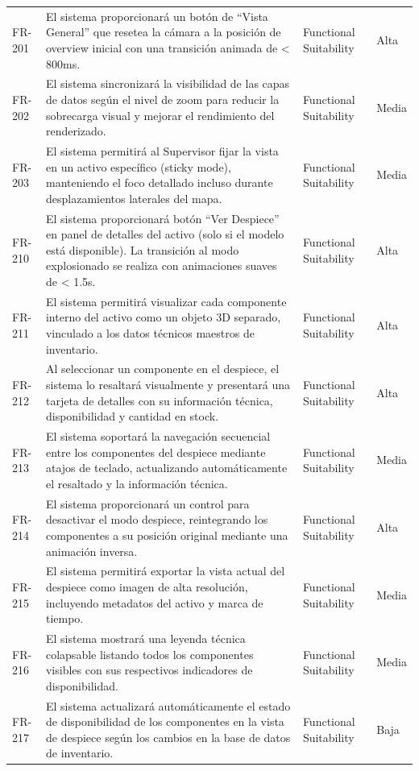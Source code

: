 \begin{longtable}{>{\raggedright\arraybackslash}p{} >{\raggedright\arraybackslash}p{} >{\raggedright\arraybackslash}p{} >{\raggedright\arraybackslash}p{}}
FR-201 & El sistema proporcionará un botón de ``Vista General'' que resetea la cámara a la posición de overview inicial con una transición animada de < 800ms. & Functional Suitability & Alta \\
FR-202 & El sistema sincronizará la visibilidad de las capas de datos según el nivel de zoom para reducir la sobrecarga visual y mejorar el rendimiento del renderizado. & Functional Suitability & Media \\
FR-203 & El sistema permitirá al Supervisor fijar la vista en un activo específico (sticky mode), manteniendo el foco detallado incluso durante desplazamientos laterales del mapa. & Functional Suitability & Media \\
FR-210 & El sistema proporcionará botón ``Ver Despiece'' en panel de detalles del activo (solo si el modelo está disponible). La transición al modo explosionado se realiza con animaciones suaves de < 1.5s. & Functional Suitability & Alta \\
FR-211 & El sistema permitirá visualizar cada componente interno del activo como un objeto 3D separado, vinculado a los datos técnicos maestros de inventario. & Functional Suitability & Alta \\
FR-212 & Al seleccionar un componente en el despiece, el sistema lo resaltará visualmente y presentará una tarjeta de detalles con su información técnica, disponibilidad y cantidad en stock. & Functional Suitability & Alta \\
FR-213 & El sistema soportará la navegación secuencial entre los componentes del despiece mediante atajos de teclado, actualizando automáticamente el resaltado y la información técnica. & Functional Suitability & Media \\
FR-214 & El sistema proporcionará un control para desactivar el modo despiece, reintegrando los componentes a su posición original mediante una animación inversa. & Functional Suitability & Alta \\
FR-215 & El sistema permitirá exportar la vista actual del despiece como imagen de alta resolución, incluyendo metadatos del activo y marca de tiempo. & Functional Suitability & Media \\
FR-216 & El sistema mostrará una leyenda técnica colapsable listando todos los componentes visibles con sus respectivos indicadores de disponibilidad. & Functional Suitability & Media \\
FR-217 & El sistema actualizará automáticamente el estado de disponibilidad de los componentes en la vista de despiece según los cambios en la base de datos de inventario. & Functional Suitability & Baja \\

\end{longtable}

